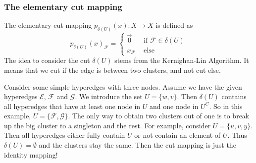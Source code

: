 \subsubsection{The elementary cut mapping}
The elementary cut mapping $p_{\delta(U)}(x): X \to X$ is defined as \[ p_{\delta(U)}(x)_{\mathcal{F}} = \begin{cases}
 \vec{0}  & \text{ if } \mathcal{F} \in \delta(U) \\
  x_{\mathcal{F}} &\text{ else} 
\end{cases} \] 
The idea to consider the cut $\delta(U)$ stems from the Kernighan-Lin Algorithm. It means that we cut if the edge is between two clusters, and not cut else.  

Consider some simple hyperedges with three nodes. Assume we have the given hyperedges $\mathcal{E}$, $\mathcal{F}$ and $\mathcal{G}$. We introduce the set $U=\{w,v\}$. Then $\delta(U)$ contains all hyperedges that have at least one node in $U$ and one node in $U^C$. So in this example, $U=\{\mathcal{F}, \mathcal{G}\}$. 
The only way to obtain two clusters out of one is to break up the big cluster to a singleton and the rest. For example, consider $U=\{u,v,y\}$. Then all hyperedges either fully contain $U$ or not contain an element of $U$. Thus $\delta(U)=\emptyset$ and the clusters stay the same. Then the cut mapping is just the identity mapping! 
\begin{figure}[h]
\end{figure}
